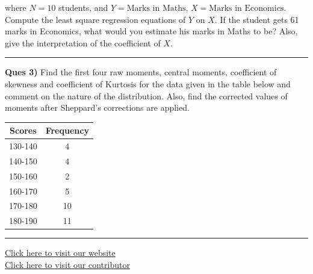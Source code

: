 \documentclass[11pt,a4paper]{article}
\begin{document}
where $N=10$ students, and $Y =  \text{Marks in Maths}$, $X =  \text{Marks in Economics}$. Compute the least square regression equations of $Y$ on $X$. If the student gets 61 marks in Economics, what would you estimate his marks in Maths to be? Also, give the interpretation of the coefficient of $X$.

\medskip\rule{\linewidth}{0.2pt}\medskip




\noindent   \textbf{Ques 3)} Find the first four raw moments, central moments, coefficient of skewness and coefficient of Kurtosis for the data given in the table below and comment on the nature of the distribution. Also, find the corrected values of moments after Sheppard's corrections are applied.


\begin{center}
\small

\begin{tabular}{|c|c|}
\hline
   \textbf{Scores} &   \textbf{Frequency} \\ \hline
130-140 & 4 \\ \hline
140-150 & 4 \\ \hline
150-160 & 2 \\ \hline
160-170 & 5 \\ \hline
170-180 & 10 \\ \hline
180-190 & 11 \\ \hline
\end{tabular}
\end{center}

\vfill
\rule{\linewidth}{0.4pt}

\begin{center}\small
\href{https://bhu-exam.vercel.app/}{Click here to visit our website}\\[4pt]
\href{https://me-aryan.vercel.app/}{Click here to visit our contributor}
\end{center}
\end{document}
